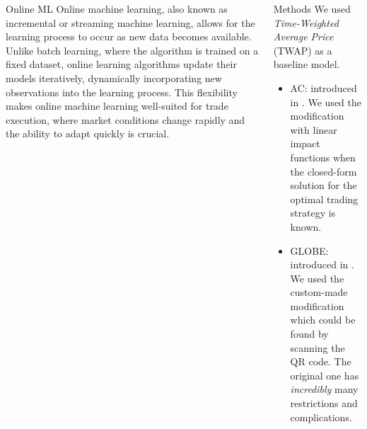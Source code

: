 \documentclass[]{beamer}
\begin{document}
\begin{frame}[t]
\begin{columns}[t]
\begin{column}{\twocolwid}
\begin{columns}[t,totalwidth=\twocolwid]
\begin{column}{\onecolwid}
    
    \begin{block}{Online ML}
        Online machine learning, also known as incremental or streaming machine learning, allows for the learning process to occur as new data becomes available. Unlike batch learning, where the algorithm is trained on a fixed dataset, online learning algorithms update their models iteratively, dynamically incorporating new observations into the learning process. This flexibility makes online machine learning well-suited for trade execution, where market conditions change rapidly and the ability to adapt quickly is crucial.
    \end{block}
    
    \

    
    \end{column} %
        
    \begin{column}{\onecolwid}\vspace{-.6in} %
    
    
    \begin{block}{Methods}
        We used \emph{Time-Weighted Average Price} (TWAP) as a baseline model.
        \begin{itemize}
            \item AC: introduced in \cite{Almgren2000}. We used the modification with linear impact functions when the closed-form solution for the optimal trading strategy is known.
            \item GLOBE: introduced in \cite{Akbarzadeh2018}. We used the custom-made modification which could be found by scanning the QR code. The original one has \emph{incredibly} many restrictions and complications.
        \end{itemize}
    \end{block}
    
    

\end{column}
\end{columns}
\end{column}
\end{columns}
\end{frame}
\end{document}

